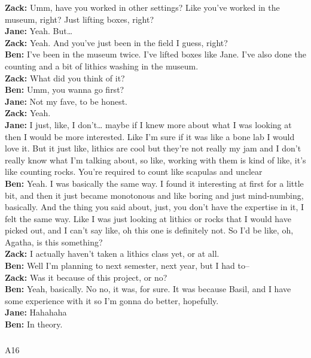 \documentclass[
  canadian,
]{article}
\makeatletter
\let\oldsubparagraph\subparagraph
\renewcommand{\subparagraph}{
    \@ifstar
      \xxxSubParagraphStar
      \xxxSubParagraphNoStar
  }
\newcommand{\xxxSubParagraphStar}[1]{\oldsubparagraph*{#1}\mbox{}}
\newcommand{\xxxSubParagraphNoStar}[1]{\oldsubparagraph{#1}\mbox{}}
\makeatother
\begin{document}
\textbf{Zack:} Umm, have you worked in other settings? Like you've
worked in the museum, right? Just lifting boxes, right?\\
\textbf{Jane:} Yeah. But\ldots{}\\
\textbf{Zack:} Yeah. And you've just been in the field I guess, right?\\
\textbf{Ben:} I've been in the museum twice. I've lifted boxes like
Jane. I've also done the counting and a bit of lithics washing in the
museum.\\
\textbf{Zack:} What did you think of it?\\
\textbf{Ben:} Umm, you wanna go first?\\
\textbf{Jane:} Not my fave, to be honest.\\
\textbf{Zack:} Yeah.\\
\textbf{Jane:} I just, like, I don't\ldots{} maybe if I knew more about
what I was looking at then I would be more interested. Like I'm sure if
it was like a bone lab I would love it. But it just like, lithics are
cool but they're not really my jam and I don't really know what I'm
talking about, so like, working with them is kind of like, it's like
counting rocks. You're required to count like scapulas and unclear\\
\textbf{Ben:} Yeah. I was basically the same way. I found it interesting
at first for a little bit, and then it just became monotonous and like
boring and just mind-numbing, basically. And the thing you said about,
just, you don't have the expertise in it, I felt the same way. Like I
was just looking at lithics or rocks that I would have picked out, and I
can't say like, oh this one is definitely not. So I'd be like, oh,
Agatha, is this something?\\
\textbf{Zack:} I actually haven't taken a lithics class yet, or at
all.\\
\textbf{Ben:} Well I'm planning to next semester, next year, but I had
to--\\
\textbf{Zack:} Was it because of this project, or no?\\
\textbf{Ben:} Yeah, basically. No no, it was, for sure. It was because
Basil, and I have some experience with it so I'm gonna do better,
hopefully.\\
\textbf{Jane:} Hahahaha\\
\textbf{Ben:} In theory.

\subparagraph{A16}\label{sec-A16}
\end{document}
